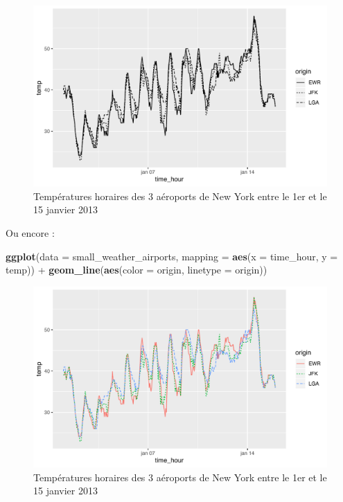 \documentclass[a4paperpaper,]{article}
\newenvironment{Shaded}{\begin{snugshade}}{\end{snugshade}}
\newcommand{\DataTypeTok}[1]{\textcolor[rgb]{0.00,0.34,0.68}{#1}}
\newcommand{\KeywordTok}[1]{\textcolor[rgb]{0.12,0.11,0.11}{\textbf{#1}}}
\newcommand{\NormalTok}[1]{\textcolor[rgb]{0.12,0.11,0.11}{#1}}
\newcommand{\OperatorTok}[1]{\textcolor[rgb]{0.12,0.11,0.11}{#1}}
\newcommand{\StringTok}[1]{\textcolor[rgb]{0.75,0.01,0.01}{#1}}
\theoremstyle{definition}
\theoremstyle{definition}
\theoremstyle{definition}
\theoremstyle{remark}
\begin{document}
\begin{figure}[htpb]

{\centering \includegraphics[width=0.9\linewidth]{figure/linetype-1} 

}

\caption{Températures horaires des 3 aéroports de New York entre le 1er et le 15 janvier 2013}\label{fig:linetype}
\end{figure}

Ou encore :

\begin{Shaded}
\begin{Highlighting}[]
\KeywordTok{ggplot}\NormalTok{(}\DataTypeTok{data =}\NormalTok{ small_weather_airports, }\DataTypeTok{mapping =} \KeywordTok{aes}\NormalTok{(}\DataTypeTok{x =}\NormalTok{ time_hour, }\DataTypeTok{y =}\NormalTok{ temp)) }\OperatorTok{+}
\StringTok{  }\KeywordTok{geom_line}\NormalTok{(}\KeywordTok{aes}\NormalTok{(}\DataTypeTok{color =}\NormalTok{ origin, }\DataTypeTok{linetype =}\NormalTok{ origin))}
\end{Highlighting}
\end{Shaded}

\begin{figure}[htpb]

{\centering \includegraphics[width=0.9\linewidth]{figure/linetypecolor-1} 

}

\caption{Températures horaires des 3 aéroports de New York entre le 1er et le 15 janvier 2013}\label{fig:linetypecolor}
\end{figure}
\end{document}
